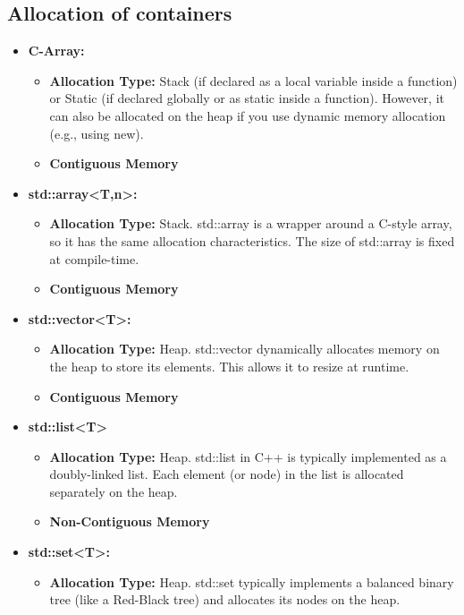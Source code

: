 \documentclass{report}
\begin{document}
    \subsection{Allocation of containers}
    \begin{itemize}
        \item \textbf{C-Array:}
        \begin{itemize}
            \item \textbf{Allocation Type:} Stack (if declared as a local variable inside a function) or Static (if declared globally or as static inside a function). However, it can also be allocated on the heap if you use dynamic memory allocation (e.g., using new).
            \item \textbf{Contiguous Memory}
        \end{itemize}
        \item \textbf{std::array<T,n>:}
        \begin{itemize}
            \item \textbf{Allocation Type:} Stack. std::array is a wrapper around a C-style array, so it has the same allocation characteristics. The size of std::array is fixed at compile-time.
            \item \textbf{Contiguous Memory}
        \end{itemize}
        \item \textbf{std::vector<T>:}
        \begin{itemize}
            \item \textbf{Allocation Type:} Heap. std::vector dynamically allocates memory on the heap to store its elements. This allows it to resize at runtime.
            \item \textbf{Contiguous Memory}
        \end{itemize}
        \item \textbf{std::list<T>}
        \begin{itemize}
            \item \textbf{Allocation Type:} Heap. std::list in C++ is typically implemented as a doubly-linked list. Each element (or node) in the list is allocated separately on the heap. 
            \item \textbf{Non-Contiguous Memory}
        \end{itemize}
        \item \textbf{std::set<T>:}
        \begin{itemize}
            \item \textbf{Allocation Type:} Heap. std::set typically implements a balanced binary tree (like a Red-Black tree) and allocates its nodes on the heap.

\end{itemize}
\end{itemize}
\end{document}
